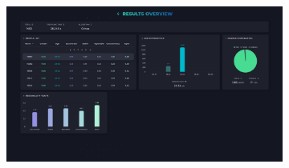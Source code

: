 \begin{figure}[H]
	\centering
	\begin{subfigure}[c]{0.74\textwidth}
		\centering
		\includegraphics[width=\textwidth]{imagenes/dashboard-grivas-500.png}
		\label{fig:casouso_dashboard_grivas_escritorio}
	\end{subfigure}
	\hfill
	\begin{subfigure}[c]{0.21\textwidth}
		\centering

\end{subfigure}
\end{figure}
